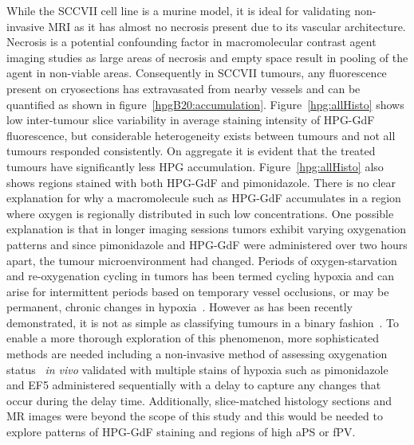  While the SCCVII cell line is a murine model, it is ideal for validating non-invasive MRI as it has almost no necrosis present due to its vascular architecture.
Necrosis is a potential confounding factor in macromolecular contrast agent imaging studies as large areas of necrosis and empty space result in pooling of the agent in non-viable areas.
Consequently in SCCVII tumours, any fluorescence present on cryosections has extravasated from nearby vessels and can be quantified as shown in figure~\ref{hpgB20:accumulation}.
Figure~\ref{hpg:allHisto} shows low inter-tumour slice variability in average staining intensity of \acs{HPG-GdF} fluorescence, but considerable heterogeneity exists between tumours and not all tumours responded consistently.
On aggregate it is evident that the treated tumours have significantly less HPG accumulation.
Figure~\ref{hpg:allHisto} also shows regions stained with both \acs{HPG-GdF} and pimonidazole.
There is no clear explanation for why a macromolecule such as \acs{HPG-GdF} accumulates in a region where oxygen is regionally distributed in such low concentrations.
One possible explanation is that in longer imaging sessions tumors exhibit varying oxygenation patterns and since pimonidazole and \acs{HPG-GdF} were administered over two hours apart, the tumour microenvironment had changed. 
Periods of oxygen-starvation and re-oxygenation cycling in tumors has been termed cycling hypoxia and can arise for intermittent periods based on temporary vessel occlusions, or may be permanent, chronic changes in hypoxia~\cite{Dewhirst:2009de,Michiels:2016hv}.
However as has been recently demonstrated, it is not as simple as classifying tumours in a binary fashion~\cite{Bayer:2011js}.
To enable a more thorough exploration of this phenomenon, more sophisticated methods are needed including a non-invasive method of assessing oxygenation status ~\emph{in vivo} validated with multiple stains of hypoxia such as pimonidazole and EF5 administered sequentially with a delay to capture any changes that occur during the delay time.
Additionally, slice-matched histology sections and MR images were beyond the scope of this study and this would be needed to explore patterns of \acs{HPG-GdF} staining and regions of high \acs{aPS} or \acs{fPV}.

